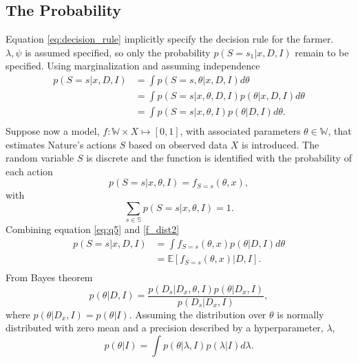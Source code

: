 \begin{example}
	\subsection{The Probability}
	\label{section:sex}
	Equation \eqref{eq:decision_rule} implicitly specify the decision rule for the farmer. $\lambda,\psi$ is assumed specified, so only the probability $p(S= s_1|x,D,I)$ remain to be specified. Using marginalization and assuming independence 
	\begin{equation}
		\begin{split}
			p(S= s|x,D,I) &= \int p(S= s,\theta|x,D,I) d\theta \\
			& = \int p(S= s|x,\theta,D,I)  p(\theta|x,D,I)d\theta \\
			& = \int p(S= s|x,\theta,I)  p(\theta|D,I)d\theta. \\
		\end{split}
		\label{eq:q5}
	\end{equation}
	Suppose now a model, $f: \mathbb{W}\times X\mapsto[0,1]$, with associated parameters $\theta\in \mathbb{W}$, that estimates Nature's actions $S$ based on observed data $X$ is introduced. The random variable $S$ is discrete and the function is identified with the probability of each action
	\begin{equation}
		p(S = s|x,\theta,I)= f_{S = s}(\theta,x),
		\label{f_dist2}
	\end{equation}
	with
	\begin{equation}
		\sum_{s\in\mathbb{S}} p(S = s|x,\theta,I) = 1.
	\end{equation}
	Combining equation \eqref{eq:q5} and \eqref{f_dist2}
	\begin{equation}
		\begin{split}
			p(S= s|x,D,I) & = \int f_{S = s}(\theta,x)  p(\theta|D,I)d\theta \\
			& = \mathbb{E}[f_{S = s}(\theta,x)|D,I].\\
		\end{split}
	\end{equation}
	From Bayes theorem
	\begin{equation}
		p(\theta|D,I) =\frac{p(D_s|D_x,\theta,I)p(\theta|D_x,I)}{p(D_s|D_x,I)},
	\end{equation}
	where $p(\theta|D_x,I) = p(\theta|I)$. Assuming the distribution over $\theta$ is normally distributed with zero mean and a precision described by a hyperparameter, $\lambda$, 
	\begin{equation}
		p(\theta|I) = \int p(\theta|\lambda,I)p(\lambda|I)d\lambda.

\end{equation}
\end{example}
